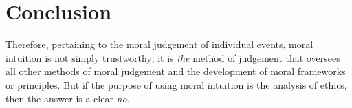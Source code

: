 \documentclass{scrartcl}
\begin{document}
\section{Conclusion}

Therefore, pertaining to the moral judgement of individual events, moral intuition is not simply trustworthy; it is \emph{the} method of judgement that oversees all other methods of moral judgement and the development of moral frameworks or principles. But if the purpose of using moral intuition is the analysis of ethics, then the answer is a clear \emph{no}.

\printbibliography
\end{document}
